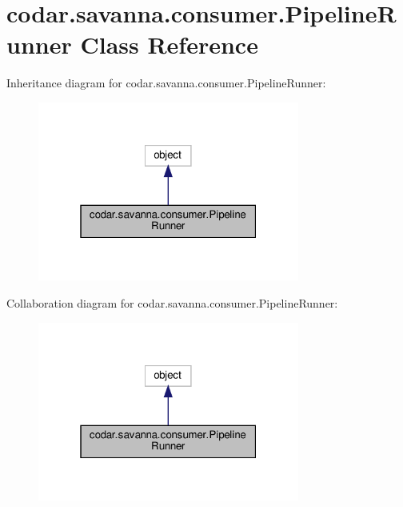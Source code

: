 \hypertarget{classcodar_1_1savanna_1_1consumer_1_1_pipeline_runner}{}\section{codar.\+savanna.\+consumer.\+Pipeline\+Runner Class Reference}
\label{classcodar_1_1savanna_1_1consumer_1_1_pipeline_runner}


Inheritance diagram for codar.\+savanna.\+consumer.\+Pipeline\+Runner\+:
\nopagebreak
\begin{figure}[H]
\begin{center}
\leavevmode
\includegraphics[width=244pt]{classcodar_1_1savanna_1_1consumer_1_1_pipeline_runner__inherit__graph}
\end{center}
\end{figure}


Collaboration diagram for codar.\+savanna.\+consumer.\+Pipeline\+Runner\+:
\nopagebreak
\begin{figure}[H]
\begin{center}
\leavevmode
\includegraphics[width=244pt]{classcodar_1_1savanna_1_1consumer_1_1_pipeline_runner__coll__graph}
\end{center}
\end{figure}
